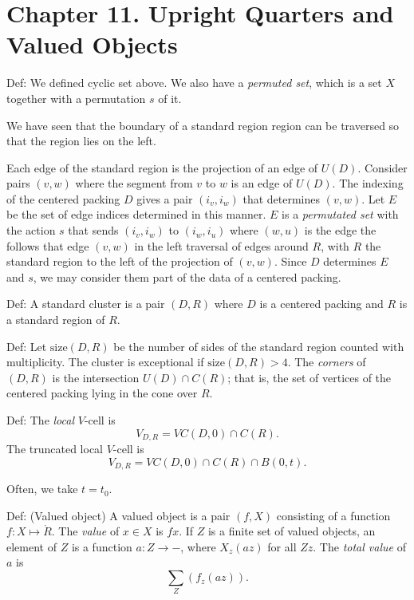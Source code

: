 
\chapter{Chapter 11. Upright Quarters and Valued Objects}

Def: We defined cyclic set above.  We also have a {\it permuted set}, which
is a set $X$ together with a permutation $s$ of it.

We have seen that the boundary of a standard region region can be traversed
so that the region lies on the left.

Each edge of the standard region is the projection of an edge of
$U(D)$. Consider pairs $(v,w)$ where the segment from $v$ to $w$
is an edge of $U(D)$.  The indexing of the centered packing $D$
gives a pair $(i_v,i_w)$ that determines $(v,w)$.  Let $E$ be the
set of edge indices determined in this manner.  $E$ is a {\it
permutated set\/} with the action $s$ that sends $(i_v,i_w)$ to
$(i_w,i_u)$ where $(w,u)$ is the edge the follows that edge
$(v,w)$ in the left traversal of edges around $R$, with $R$ the
standard region to the left of the projection of $(v,w)$.  Since
$D$ determines $E$ and $s$, we may consider them part of the data
of a centered packing.

Def:  A standard cluster is a pair $(D,R)$ where $D$ is a centered
packing and $R$ is a standard region of $R$.

Def:  Let $\text{size}(D,R)$ be the number of sides of the
standard region counted with multiplicity.  The cluster is
exceptional if $\text{size}(D,R) > 4$.  The {\it corners} of
$(D,R)$ is the intersection $U(D) \cap C(R)$; that is, the set of
vertices of the centered packing lying in the cone over $R$.

Def: The {\it local } $V$-cell is
$$V_{D,R} = VC(D,0) \cap C(R).$$
The truncated local $V$-cell is
$$V_{D,R} = VC(D,0) \cap C(R) \cap B(0,t).$$

Often, we take $t = t_0$.

Def: (Valued object)  A valued object is a pair $(f,X)$ consisting
of a function $f:X \mapsto \ring{R}$.  The
{\it value\/} of $x\in X$ is $f x$.  If $Z$ is a finite
set of valued objects, an element of $Z$ is a function $a:Z \to -$,
where $X_z(a z)$ for all $Z z$.  The {\it total value} of $a$ is
$$\sum_Z (f_z (a z)).$$

